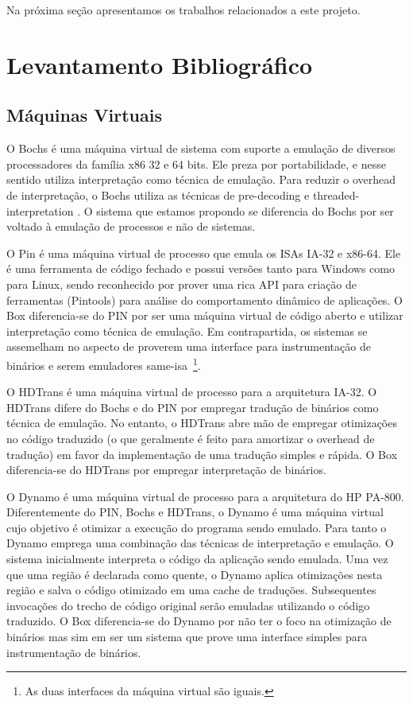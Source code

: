 \documentclass[11pt,twoside]{article}
\begin{document}
Na próxima seção apresentamos os trabalhos relacionados a este projeto.


\section{Levantamento Bibliográfico}

\subsection{Máquinas Virtuais}
O Bochs \cite{bochs} é uma máquina virtual de sistema com suporte a emulação
de diversos processadores da família x86 32 e 64 bits. Ele preza
por portabilidade, e nesse sentido utiliza interpretação como técnica
de emulação. Para reduzir o overhead de interpretação, o Bochs utiliza
as técnicas de pre-decoding \cite{smith} e threaded-interpretation \cite{smith}.
O sistema que estamos propondo se diferencia do Bochs por ser voltado
à emulação de processos e não de sistemas.

O Pin \cite{pin} é uma máquina virtual de processo que emula os ISAs IA-32
e x86-64. Ele é uma ferramenta de código fechado e possui versões tanto
para Windows como para Linux, sendo reconhecido por prover uma rica
API para criação de ferramentas (Pintools) para análise do comportamento 
dinâmico de aplicações. O Box diferencia-se do PIN por ser uma máquina
virtual de código aberto e utilizar interpretação como técnica de emulação.
Em contrapartida, os sistemas se assemelham no aspecto de proverem uma
interface para instrumentação de binários e serem emuladores same-isa~\footnote{As duas interfaces da máquina virtual são iguais.}.

O HDTrans \cite{hdtrans} é uma máquina virtual de processo para
a arquitetura IA-32. O HDTrans difere do Bochs e do PIN por empregar tradução
de binários como técnica de emulação. No entanto, o HDTrans abre mão de 
empregar otimizações no código traduzido (o que geralmente é feito para 
amortizar o overhead de tradução) em favor da implementação de uma tradução
simples e rápida. O Box diferencia-se do HDTrans por empregar interpretação 
de binários.

O Dynamo \cite{dynamo} é uma máquina virtual de processo para a arquitetura
do HP PA-800. Diferentemente do PIN, Bochs e HDTrans, o Dynamo é uma máquina
virtual cujo objetivo é otimizar a execução do programa sendo emulado.
Para tanto o Dynamo emprega uma combinação das técnicas de interpretação
e emulação. O sistema inicialmente interpreta o código da aplicação sendo 
emulada. Uma vez que uma região é declarada como quente, o Dynamo aplica 
otimizações nesta região e salva o código otimizado em uma cache de traduções. 
Subsequentes invocações do trecho de código original serão emuladas utilizando 
o código traduzido. O Box diferencia-se do Dynamo por não ter o foco na otimização 
de binários mas sim em ser um sistema que prove uma interface simples para 
instrumentação de binários.
\end{document}
